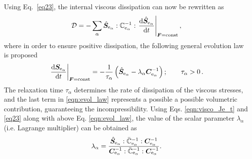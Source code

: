 Using Eq.~\eqref{eq23}, the internal viscous dissipation can now be rewritten as
%
\begin{equation}
	\label{eq28}
	\mathcal{D} = -\sum_{\alpha} \hat{\boldsymbol{S}}_{\mathrm{e}_{\alpha}} : \mathbb{C}_{\mathrm{e}_{\alpha}}^{-1} : \left.\frac{\mathrm{d}\hat{\boldsymbol{S}}_{\mathrm{e}_{\alpha}} }{\mathrm{d}t} \right|_{\boldsymbol{F}=\text{const}},
\end{equation}
%
where in order to ensure positive dissipation, the following general evolution law is proposed
%
\begin{equation}
	\label{eqn:evol_law}
	\left.\frac{\mathrm{d}\boldsymbol{S}_{\mathrm{e}_{\alpha}} }{\mathrm{d}t} \right|_{\boldsymbol{F}=\text{const}} =
    -\frac{1}{\tau_\alpha} \left( 
      \hat{\boldsymbol{S}}_{\mathrm{e}_{\alpha}} -\lambda_\alpha \boldsymbol{C}_{\mathrm{e}_{\alpha}}^{-1}
    \right); \quad\quad
  \tau_\alpha > 0 \,.
\end{equation}
%
The relaxation time $\tau_\alpha$  determines the rate of dissipation of the viscous stresses, and the last term in \eqref{eqn:evol_law} represents a possible a possible volumetric contribution,  guaranteeing the incompressibility. Using Eqs. \eqref{eqn:visco_Je_t} and \eqref{eq23} along with above Eq. \eqref{eqn:evol_law}, the value of the scalar parameter $\lambda_\alpha$ (i.e. Lagrange multiplier) can be obtained as
%
\begin{equation}
	\label{eqn:Lagrange_multiplier}
	\lambda_\alpha = \frac{\hat{\boldsymbol{S}}_{\mathrm{e}_{\alpha}} : \bar{\mathbb{C}}^{-1}_{\mathrm{e}_{\alpha}} : \boldsymbol{C}_{\mathrm{e}_{\alpha}}^{-1}}{\boldsymbol{C}_{\mathrm{e}_{\alpha}}^{-1} : \bar{\mathbb{C}}^{-1}_{\mathrm{e}_{\alpha}} : \boldsymbol{C}_{\mathrm{e}_{\alpha}}^{-1}}.
\end{equation}


